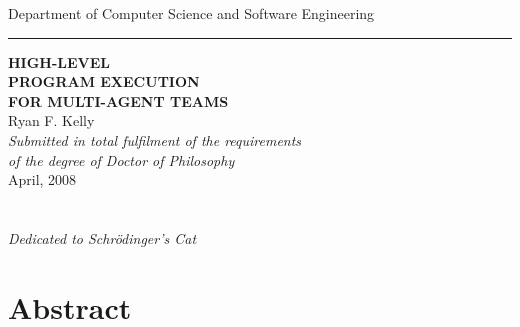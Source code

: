 \documentclass[a4paper,twoside,12pt]{book}
\begin{document}

\begin{titlepage}
\begin{figure}[tp]
\centering
\end{figure}
\begin{center}
{\Large Department of Computer Science and Software Engineering}\\ \vspace{0.1cm}
\rule{150mm}{0.5mm}

\vspace{1cm}
{\bf\LARGE   HIGH-LEVEL }\\ \vspace{0.3cm} %
{\bf\LARGE   PROGRAM EXECUTION }\\ \vspace{0.3cm} %
{\bf\LARGE   FOR MULTI-AGENT TEAMS } \\ %
\vspace{2cm}
{\LARGE      Ryan F. Kelly       }\\
\vspace{5cm}
{\em\large Submitted in total fulfilment of the requirements}\\ \vspace{0.1cm}
{\em\large        of the degree of Doctor of Philosophy     }\\
\vspace{0.5cm}
{\Large             April, 2008        }\\
\vspace{0.5cm}
\end{center}
\end{titlepage}
\cleardoublepage     %

\chapter*{ } %
\begin{center} \emph{Dedicated to Schr\"{o}dinger's Cat}
\end{center}

\chapter*{Abstract}

\end{document}
